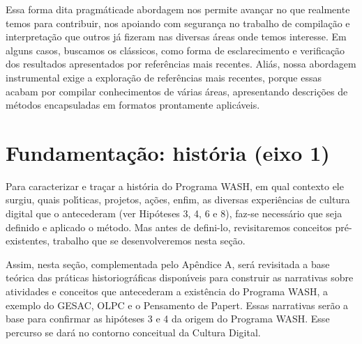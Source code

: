 \documentclass[
12pt,		%
openright,	%
twoside,  %
a4paper,			%
chapter=TITLE,		%
english,			%
french,				%
spanish,			%
brazil				%
]{USPSC-classe/USPSC}
\begin{document}
Essa forma dita \textquotedbl pragm\'atica\textquotedbl  de abordagem nos permite avan\c{c}ar no que realmente temos para contribuir, nos apoiando com seguran\c{c}a no trabalho de compila\c{c}\~ao e interpreta\c{c}\~ao que outros j\'a fizeram nas diversas \'areas onde temos interesse. Em alguns casos, buscamos os cl\'assicos, como forma de esclarecimento e verifica\c{c}\~ao dos resultados apresentados por refer\^encias mais recentes. Ali\'as, nossa abordagem instrumental exige a explora\c{c}\~ao de refer\^encias mais recentes, porque essas acabam por compilar conhecimentos de v\'arias \'areas, apresentando descri\c{c}\~oes de m\'etodos encapsuladas em formatos prontamente aplic\'aveis.










\section[Fundamenta\c{c}\~ao: hist\'oria (eixo 1)]{Fundamenta\c{c}\~ao: hist\'oria (eixo 1)}\label{Fundamenta\c{c}\~ao: hist\'oria (eixo 1)}
Para caracterizar e tra\c{c}ar a hist\'oria do Programa WASH, em qual contexto ele surgiu, quais pol\'{\i}ticas, projetos, a\c{c}\~oes, enfim, as diversas experi\^encias de cultura digital que o antecederam (ver Hip\'oteses 3, 4, 6 e 8), faz-se  necess\'ario que seja definido e aplicado o m\'etodo. Mas antes de defini-lo, revisitaremos conceitos pr\'e-existentes, trabalho que se desenvolveremos nesta se\c{c}\~ao.










Assim, nesta se\c{c}\~ao, complementada pelo Ap\^endice A, ser\'a revisitada a base te\'orica das pr\'aticas historiogr\'aficas dispon\'{\i}veis para construir as narrativas sobre atividades e conceitos que antecederam a exist\^encia do Programa WASH, a exemplo do GESAC, OLPC e o Pensamento de Papert. Essas narrativas ser\~ao a base para  confirmar as hip\'oteses 3 e 4  da origem do Programa WASH. Esse percurso se dar\'a no contorno conceitual da Cultura Digital.
\end{document}
